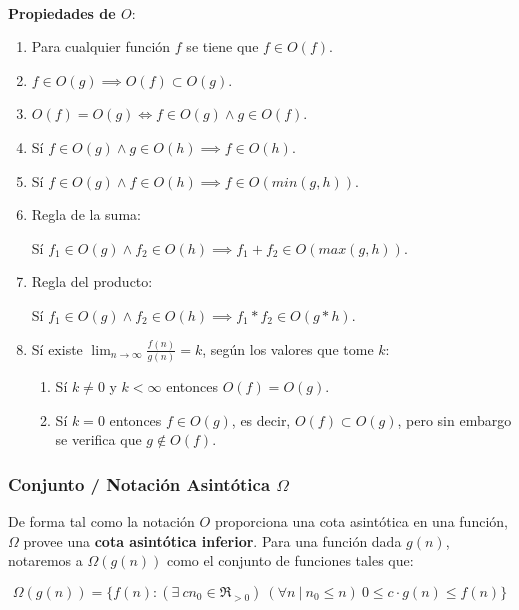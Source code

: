 ~

\textbf{Propiedades de $O$}:
\begin{enumerate}
 \item Para cualquier funci\'on $f$ se tiene que $f \in O(f)$.
 \item $f \in O(g) \implies O(f) \subset O(g)$.
 \item $O(f) = O(g) \iff f \in O(g) \land g \in O(f)$.
 \item S\'i $f \in O(g) \land g \in O(h) \implies f \in O(h)$.
 \item S\'i $f \in O(g) \land f \in O(h) \implies f \in O(min(g,h))$.
 \item Regla de la suma:

	S\'i $f_1 \in O(g) \land f_2 \in O(h) \implies f_1 + f_2 \in O(max(g,h))$.
 \item Regla del producto:

	S\'i $f_1 \in O(g) \land f_2 \in O(h) \implies f_1 * f_2 \in O(g*h)$.
 \item S\'i existe $\lim_{n \to \infty} \frac{f(n)}{g(n)} = k$, seg\'un los valores que tome $k$:
	\begin{enumerate}
	  \item S\'i $k \neq 0$ y $k < \infty$ entonces $O(f) = O(g)$.
	  \item S\'i $k = 0$ entonces $f \in O(g)$, es decir, $O(f) \subset O(g)$, pero sin embargo se verifica que $g \notin O(f)$.
	\end{enumerate}
\end{enumerate}

\subsubsection{Conjunto / Notaci\'on Asint\'otica $\Omega$}

De forma tal como la notaci\'on $O$ proporciona una cota asint\'otica en una funci\'on, $\Omega$ provee una \textbf{cota asint\'otica inferior}. Para una funci\'on dada $g(n)$, notaremos a $\Omega(g(n))$ como el conjunto de funciones tales que:

\begin{equation*}
 \Omega(g(n)) = \{ f(n) : (\exists\ c n_0 \in \Re_{>0}) \ (\forall n\ |\ n_0 \leq n)\ 0 \leq c \cdot g(n) \leq f(n) \}
\end{equation*}

~

